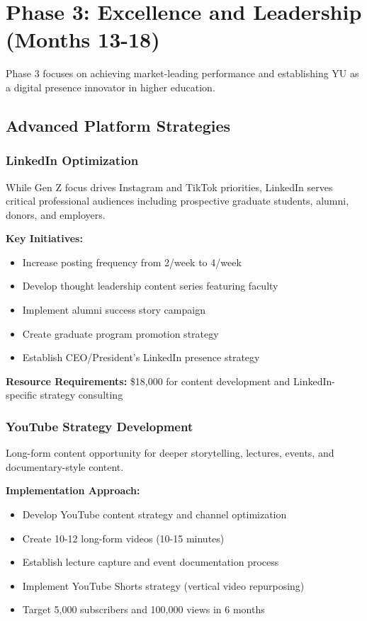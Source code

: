 \documentclass[12pt]{report}
\begin{document}
\chapter{Phase 3: Excellence and Leadership (Months 13-18)}

Phase 3 focuses on achieving market-leading performance and establishing YU as a digital presence innovator in higher education.

\section{Advanced Platform Strategies}

\subsection{LinkedIn Optimization}

While Gen Z focus drives Instagram and TikTok priorities, LinkedIn serves critical professional audiences including prospective graduate students, alumni, donors, and employers.

\textbf{Key Initiatives:}

\begin{itemize}
\item Increase posting frequency from 2/week to 4/week
\item Develop thought leadership content series featuring faculty
\item Implement alumni success story campaign
\item Create graduate program promotion strategy
\item Establish CEO/President's LinkedIn presence strategy
\end{itemize}

\textbf{Resource Requirements:} \$18,000 for content development and LinkedIn-specific strategy consulting

\subsection{YouTube Strategy Development}

Long-form content opportunity for deeper storytelling, lectures, events, and documentary-style content.

\textbf{Implementation Approach:}

\begin{itemize}
\item Develop YouTube content strategy and channel optimization
\item Create 10-12 long-form videos (10-15 minutes)
\item Establish lecture capture and event documentation process
\item Implement YouTube Shorts strategy (vertical video repurposing)
\item Target 5,000 subscribers and 100,000 views in 6 months
\end{itemize}
\end{document}
